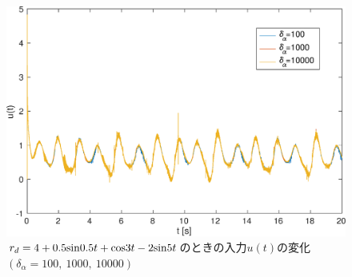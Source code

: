 \documentclass[a4paper,12pt]{jarticle}
\begin{document}
\begin{figure}[H]
 \begin{center}
  \includegraphics[scale=0.5]{../figure/eps/estimate/2/u.eps}
  \caption{$ r_d = 4 + 0.5{\rm sin}0.5t + {\rm cos}3t -2{\rm sin}5t $のときの入力$ u(t) $の変化$(\delta_{\alpha} = 100, ~ 1000, ~ 10000 )$}
  \label{ua2}
 \end{center}
\end{figure}
\end{document}

